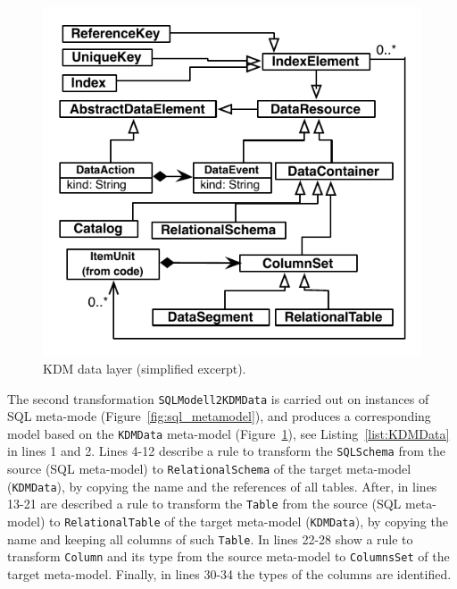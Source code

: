 \documentclass[a4paper,twoside]{article}
\begin{document}
\begin{figure}[!h]
\centering
  \includegraphics[scale=0.78]{figuras/KDM-Data-Layer}
\caption{KDM data layer (simplified excerpt).}
\label{fig:KDMDATA}
\end{figure}

The second transformation \texttt{SQLModell2KDMData} is carried out on instances of SQL meta-mode (Figure~\ref{fig:sql_metamodel}), and produces a corresponding model based on the \texttt{KDMData} meta-model (Figure~\ref{fig:KDMDATA}), see Listing~\ref{list:KDMData} in lines 1 and 2. Lines 4-12 describe a rule to transform the \texttt{SQLSchema} from the source (SQL meta-model) to \texttt{RelationalSchema} of the target meta-model (\texttt{KDMData}), by copying the name and the references of all tables. After, in lines 13-21 are described a rule to transform the \texttt{Table} from the source (SQL meta-model) to \texttt{RelationalTable} of the target meta-model (\texttt{KDMData}), by copying the name and keeping all columns of such \texttt{Table}. In lines 22-28 show a rule to transform \texttt{Column} and its type from the source meta-model to \texttt{ColumnsSet} of the target meta-model. Finally, in lines 30-34 the types of the columns are identified.
\end{document}
